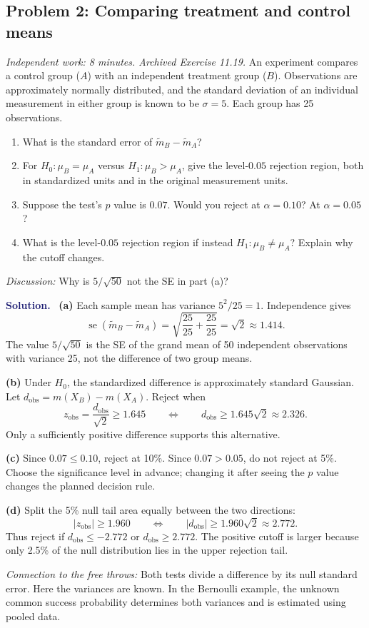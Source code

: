 \documentclass[11pt]{article}
\newcommand{\rv}[1]{\widetilde{#1}}
\newcommand{\se}{\operatorname{se}}
\newenvironment{answer}{\par\medskip\noindent\textcolor{MidnightBlue}{\textbf{Solution.}}\ }{\par\medskip}
\newcommand{\workingspace}[1]{}
\newcommand{\workingspace}[1]{\vspace{#1}}
\begin{document}
\newpage
\subsection*{Problem 2: Comparing treatment and control means}
\noindent\textit{Independent work: 8 minutes. Archived Exercise 11.19.}
An experiment compares a control group ($A$) with an independent treatment
group ($B$). Observations are approximately normally distributed, and the
standard deviation of an individual measurement in either group is known
to be $\sigma=5$. Each group has 25 observations.
\begin{enumerate}
 \item What is the standard error of $\rv m_B-\rv m_A$?
 \item For $H_0:\mu_B=\mu_A$ versus $H_1:\mu_B>\mu_A$, give the
 level-$0.05$ rejection region, both in standardized units and in the
 original measurement units.
 \item Suppose the test's $p$ value is $0.07$. Would you reject at
 $\alpha=0.10$? At $\alpha=0.05$?
 \item What is the level-$0.05$ rejection region if instead
 $H_1:\mu_B\ne\mu_A$? Explain why the cutoff changes.
\end{enumerate}
\noindent\textit{Discussion:} Why is $5/\sqrt{50}$ not the SE in part (a)?
\workingspace{10cm}
\begin{answer}
\textbf{(a)} Each sample mean has variance $5^2/25=1$. Independence gives
\[
 \boxed{\se(\rv m_B-\rv m_A)=\sqrt{\frac{25}{25}+\frac{25}{25}}
 =\sqrt2\approx1.414.}
\]
The value $5/\sqrt{50}$ is the SE of the grand mean of 50 independent
observations with variance 25, not the difference of two group means.

\textbf{(b)} Under $H_0$, the standardized difference is approximately
standard Gaussian. Let $d_{\mathrm{obs}}=m(X_B)-m(X_A)$. Reject when
\[
 \boxed{z_{\mathrm{obs}}=\frac{d_{\mathrm{obs}}}{\sqrt2}\geq1.645}
 \qquad\Longleftrightarrow\qquad
 \boxed{d_{\mathrm{obs}}\geq1.645\sqrt2\approx2.326.}
\]
Only a sufficiently positive difference supports this alternative.

\textbf{(c)} Since $0.07\leq0.10$, reject at 10\%. Since $0.07>0.05$,
do not reject at 5\%. Choose the significance level in advance;
changing it after seeing the $p$ value changes the planned decision rule.

\textbf{(d)} Split the 5\% null tail area equally between the two directions:
\[
 \boxed{|z_{\mathrm{obs}}|\geq1.960}
 \qquad\Longleftrightarrow\qquad
 \boxed{|d_{\mathrm{obs}}|\geq1.960\sqrt2\approx2.772.}
\]
Thus reject if $d_{\mathrm{obs}}\leq-2.772$ or $d_{\mathrm{obs}}\geq2.772$.
The positive cutoff is larger because only 2.5\% of the null distribution
lies in the upper rejection tail.

\medskip
\noindent\textit{Connection to the free throws:} Both tests divide a difference
by its null standard error. Here the variances are known. In the Bernoulli
example, the unknown common success probability determines both variances
and is estimated using pooled data.
\end{answer}
\end{document}
